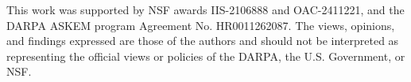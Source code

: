 This work was supported by NSF awards IIS-2106888 and OAC-2411221, and the DARPA
ASKEM program
Agreement No. HR0011262087. The views, opinions, and findings expressed are those of the authors and should not be interpreted as representing the official views or policies of the DARPA, the U.S. Government, or NSF.
